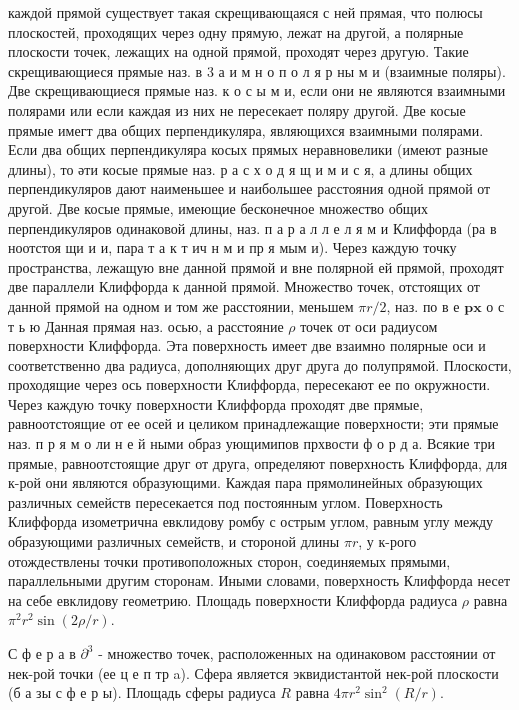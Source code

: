 \documentclass[10pt]{article}
\begin{document}
каждой прямой существует такая скрещивающаяся с ней прямая, что полюсы плоскостей, проходящих через одну прямую, лежат на другой, а полярные плоскости точек, лежащих на одной прямой, проходят через другую. Такие скрещивающиеся прямые наз. в 3 а и м н о п о л я р ны м и (взаимные поляры). Две скрещивающиеся прямые наз. к о с ы м и, если они не являются взаимными полярами или если каждая из них не пересекает поляру другой. Две косые прямые имегт два общих перпендикуляра, являющихся взаимными полярами. Если два общих перпендикуляра косых прямых неравновелики (имеют разные длины), то әти косые прямые наз. р а с х о д я щ и м и с я, а длины общих перпендикуляров дают наименьшее и наибольшее расстояния одной прямой от другой. Две косые прямые, имеющие бесконечное множество общих перпендикуляров одинаковой длины, наз. п а р а л л е л я м и Клиффорда (ра в ноотстоя щи и и, пара т а к т ич н м и пр я мым и). Через каждую точку пространства, лежащую вне данной прямой и вне полярной ей прямой, проходят две параллели Клиффорда к данной прямой. Множество точек, отстоящих от данной прямой на одном и том же расстоянии, меньшем $\pi r / 2$, наз. по в е $\mathbf{p} \mathbf{x}$ о с т ь ю Данная прямая наз. осью, а расстояние $\rho$ точек от оси радиусом поверхности Клиффорда. Эта поверхность имеет две взаимно полярные оси и соответственно два радиуса, дополняющих друг друга до полупрямой. Плоскости, проходящие через ось поверхности Клиффорда, пересекают ее по окружности. Через каждую точку поверхности Клиффорда проходят две прямые, равноотстоящие от ее осей и целиком принадлежащие поверхности; эти прямые наз. п р я м о ли н е й ными образ ующимипов прхвости ф о р д а. Всякие три прямые, равноотстоящие друг от друга, определяют поверхность Клиффорда, для к-рой они являются образующими. Каждая пара прямолинейных образующих различных семейств пересекается под постоянным углом. Поверхность Клиффорда изометрична евклидову ромбу с острым углом, равным углу между образующими различных семейств, и стороной длины $\pi r$, у к-рого отождествлены точки противоположных сторон, соединяемых прямыми, параллельными другим сторонам. Иными словами, поверхность Клиффорда несет на себе евклидову геометрию. Площадь поверхности Клиффорда радиуса $\rho$ равна $\pi^{2} r^{2} \sin (2 \rho / r)$.



С ф е р а в $\partial^{3}$ - множество точек, расположенных на одинаковом расстоянии от нек-рой точки (ее ц е п тр a). Сфера является эквидистантой нек-рой плоскости (б а зы с ф е р ы). Площадь сферы радиуса $R$ равна $4 \pi r^{2} \sin ^{2}(R / r)$.
\end{document}
